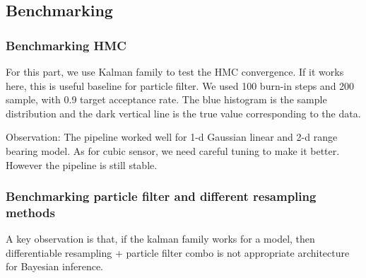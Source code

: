 \documentclass{article}
\begin{document}
\subsection{Benchmarking}

\subsubsection{Benchmarking HMC}
For this part, we use Kalman family to test the HMC convergence. If it works here, this is useful baseline for particle filter. We used 100 burn-in steps and 200 sample, with 0.9 target acceptance rate. The blue histogram is the sample distribution and the dark vertical line is the true value corresponding to the data.



Observation: The pipeline worked well for 1-d Gaussian linear and 2-d range bearing model. As for cubic sensor, we need careful tuning to make it better. However the pipeline is still stable. 

\subsubsection{Benchmarking particle filter and different resampling methods}
A key observation is that, if the kalman family works for a model, then differentiable resampling + particle filter combo is not appropriate architecture for Bayesian inference.

\end{document}
